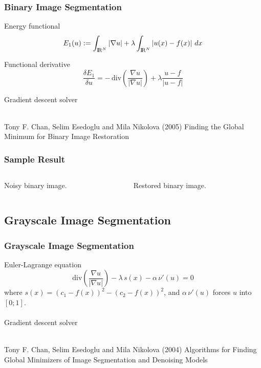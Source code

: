 \documentclass{beamer}
\begin{document}
\begin{frame}
  \frametitle{Binary Image Segmentation}

  Energy functional
  \begin{equation*}
    E_1(u) := \int_{{\rm I\!R}^N} \left| \nabla u \right|
    + \lambda \int_{{\rm I\!R}^N} \left| u(x) - f(x) \right| \, dx
  \end{equation*}

  Functional derivative
  \begin{equation*}
    \frac{\delta E_1}{\delta u} = - \, \mathrm{div} \left( {\frac{\nabla u}{| \nabla u |}} \right)
    + \lambda \frac{u - f}{|u - f|}
  \end{equation*}

  Gradient descent solver \\~\\

  \begin{thebibliography}{99}
  \bibitem[Chan, 2005]{} Tony F. Chan, Selim Esedoglu and Mila Nikolova (2005)
    \newblock Finding the Global Minimum for Binary Image Restoration
  \end{thebibliography}
\end{frame}

\begin{frame}
  \frametitle{Sample Result}
  \begin{columns}[t]
    \begin{column}{.4\textwidth}
      Noisy binary image.
    \end{column}
    \begin{column}{.4\textwidth}
      Restored binary image.
    \end{column}
  \end{columns}
\end{frame}

\subsection{Grayscale Image Segmentation}

\begin{frame}
  \frametitle{Grayscale Image Segmentation}

  Euler-Lagrange equation
  \begin{equation*}
    \mathrm{div} \left( {\frac{\nabla u}{| \nabla u |}} \right)
    - \lambda \, s(x) - \alpha \, \nu'(u) = 0
  \end{equation*}
  where $ s(x) = (c_1 - f(x))^2 - (c_2 - f(x))^2 $, and $ \alpha \, \nu'(u) $ forces $ u $ into $ [0; 1] $.
  \\~\\
  Gradient descent solver
  \\~\\
  \begin{thebibliography}{99}
  \bibitem[Chan, 2004]{} Tony F. Chan, Selim Esedoglu and Mila Nikolova (2004)
    \newblock Algorithms for Finding Global Minimizers of Image Segmentation and Denoising Models
  \end{thebibliography}
\end{frame}
\end{document}
